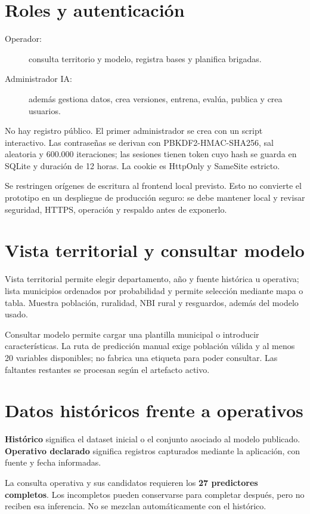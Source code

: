 \documentclass[11pt,a4paper]{report}
\begin{document}
\section{Roles y autenticación}
\begin{description}
\item[Operador:] consulta territorio y modelo, registra bases y planifica brigadas.
\item[Administrador IA:] además gestiona datos, crea versiones, entrena, evalúa, publica y crea usuarios.
\end{description}
No hay registro público. El primer administrador se crea con un script interactivo. Las contraseñas se derivan con PBKDF2-HMAC-SHA256, sal aleatoria y 600.000 iteraciones; las sesiones tienen token cuyo hash se guarda en SQLite y duración de 12 horas. La cookie es HttpOnly y SameSite estricto.

Se restringen orígenes de escritura al frontend local previsto. Esto no convierte el prototipo en un despliegue de producción seguro: se debe mantener local y revisar seguridad, HTTPS, operación y respaldo antes de exponerlo.

\section{Vista territorial y consultar modelo}
Vista territorial permite elegir departamento, año y fuente histórica u operativa; lista municipios ordenados por probabilidad y permite selección mediante mapa o tabla. Muestra población, ruralidad, NBI rural y resguardos, además del modelo usado.

Consultar modelo permite cargar una plantilla municipal o introducir características. La ruta de predicción manual exige población válida y al menos 20 variables disponibles; no fabrica una etiqueta para poder consultar. Las faltantes restantes se procesan según el artefacto activo.

\section{Datos históricos frente a operativos}
\textbf{Histórico} significa el dataset inicial o el conjunto asociado al modelo publicado. \textbf{Operativo declarado} significa registros capturados mediante la aplicación, con fuente y fecha informadas.

La consulta operativa y sus candidatos requieren los \textbf{27 predictores completos}. Los incompletos pueden conservarse para completar después, pero no reciben esa inferencia. No se mezclan automáticamente con el histórico.
\end{document}
